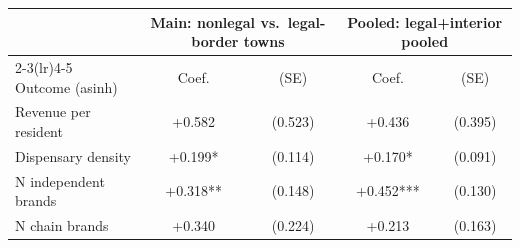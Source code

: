 \begin{tabular}{@{}lcccc@{}}
\toprule
 & \multicolumn{2}{c}{Main: nonlegal vs.\ legal-border towns} & \multicolumn{2}{c}{Pooled: legal+interior pooled} \\
\cmidrule(lr){2-3}\cmidrule(lr){4-5}
Outcome (asinh) & Coef. & (SE) & Coef. & (SE) \\
\midrule
Revenue per resident & +0.582 & (0.523) & +0.436 & (0.395) \\
Dispensary density & +0.199* & (0.114) & +0.170* & (0.091) \\
N independent brands & +0.318** & (0.148) & +0.452*** & (0.130) \\
N chain brands & +0.340 & (0.224) & +0.213 & (0.163) \\
\bottomrule
\end{tabular}
